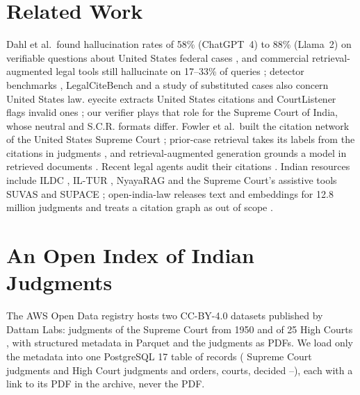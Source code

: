 

\section{Related Work}
Dahl et al.\ found hallucination rates of 58\% (ChatGPT~4) to 88\% (Llama~2) on verifiable questions about United States federal cases \cite{dahl2024}, and commercial retrieval-augmented legal tools still hallucinate on 17--33\% of queries \cite{magesh2025}; detector benchmarks \cite{liu2026checks}, LegalCiteBench \cite{legalcitebench} and a study of substituted cases \cite{verma2026} also concern United States law. eyecite extracts United States citations \cite{eyecite} and CourtListener flags invalid ones \cite{courtlistenerapi}; our verifier plays that role for the Supreme Court of India, whose neutral and S.C.R. formats differ. Fowler et al.\ built the citation network of the United States Supreme Court \cite{fowler2007}; prior-case retrieval takes its labels from the citations in judgments \cite{joshi2023ucreat,farber2020}, and retrieval-augmented generation grounds a model in retrieved documents \cite{lewis2020rag}. Recent legal agents audit their citations \cite{lmars,parthenon,maat}. Indian resources include ILDC \cite{ildc}, IL-TUR \cite{iltur}, NyayaRAG \cite{nyayarag} and the Supreme Court's assistive tools SUVAS and SUPACE \cite{suvas,supace}; open-india-law releases text and embeddings for 12.8 million judgments and treats a citation graph as out of scope \cite{openindialaw}.

\section{An Open Index of Indian Judgments}
\label{sec:corpus}
The AWS Open Data registry hosts two CC-BY-4.0 datasets published by Dattam Labs: judgments of the Supreme Court from 1950 \cite{awssc} and of 25 High Courts \cite{awshc}, with structured metadata in Parquet and the judgments as PDFs. We load only the metadata into one PostgreSQL 17 table of \CorpusTotal{} records (\CorpusSC{} Supreme Court judgments and \CorpusHC{} High Court judgments and orders, \CorpusCourts{} courts, decided \CorpusYearMin{}--\CorpusYearMax), each with a link to its PDF in the archive, never the PDF.

